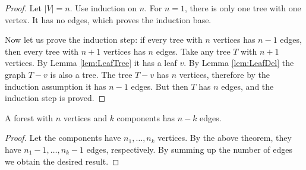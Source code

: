 \begin{page}
\setcounter{section}{2}
\setcounter{subsection}{3}
\setcounter{dfn}{7}
\label{portion:270}

\begin{proof}
Let $|V| = n$.
Use induction on $n$.
For $n=1$, there is only one tree with one vertex.
It has no edges, which proves the induction base.

Now let us prove the induction step: if every tree with $n$ vertices has $n-1$ edges, then every tree with $n+1$ vertices has $n$ edges.
Take any tree $T$ with $n+1$ vertices.
By Lemma \ref{lem:LeafTree} it has a leaf $v$.
By Lemma \ref{lem:LeafDel} the graph $T - v$ is also a tree.
The tree $T - v$ has $n$ vertices, therefore by the induction assumption it has $n-1$ edges.
But then $T$ has $n$ edges, and the induction step is proved.
\end{proof}


\end{page}

\begin{page}
\setcounter{section}{2}
\setcounter{subsection}{3}
\setcounter{dfn}{8}
\label{portion:272}

\begin{cor}
\label{cor:ForestEdges}
A forest with $n$ vertices and $k$ components has $n-k$ edges.
\end{cor}

\end{page}

\begin{page}
\setcounter{section}{2}
\setcounter{subsection}{3}
\setcounter{dfn}{8}
\label{portion:273}

\begin{proof}
Let the components have $n_1, \ldots, n_k$ vertices.
By the above theorem, they have $n_1 - 1, \ldots, n_k - 1$ edges, respectively.
By summing up the number of edges we obtain the desired result.
\end{proof}

% 

\end{page}

\begin{page}
\setcounter{section}{2}
\setcounter{subsection}{3}
\setcounter{dfn}{9}
\label{portion:275}


\end{page}

